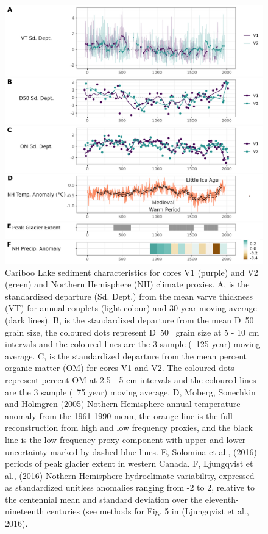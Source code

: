 \documentclass[Royal,times,doublespace,sageh]{sagej}
\begin{document}
\begin{figure}

{\centering \includegraphics[width=1\linewidth]{figs/all_core_stats_2k_anomalies} 

}

\caption{Cariboo Lake sediment characteristics for cores V1 (purple) and V2 (green) and Northern Hemisphere (NH) climate proxies. A, is the standardized departure (Sd. Dept.) from the mean varve thickness (VT) for annual couplets (light colour) and 30-year moving average (dark lines). B, is the standardized departure from the mean D~50~ grain size, the coloured dots represent D~50~ grain size at 5 - 10 cm intervals and the coloured lines are the 3 sample (~125 year) moving average. C, is the standardized departure from the mean percent organic matter (OM) for cores V1 and V2. The coloured dots represent percent OM at 2.5 - 5 cm intervals and the coloured lines are the 3 sample (~75 year) moving average. D, Moberg, Sonechkin and Holmgren (2005) Nothern Hemisphere annual temperature anomaly from the 1961-1990 mean, the orange line is the full reconstruction from high and low frequency proxies, and the black line is the low frequency proxy component with upper and lower uncertainty marked by dashed blue lines. E, Solomina et al., (2016) periods of peak glacier extent in western Canada. F, Ljungqvist et al., (2016) Nothern Hemisphere hydroclimate variability, expressed as standardized unitless anomalies ranging from -2 to 2, relative to the centennial mean and standard deviation over the eleventh-nineteenth centuries (see methods for Fig. 5 in (Ljungqvist et al., 2016).\label{fig:proxy-comparison}}\label{fig:proxy-comparison}
\end{figure}
\end{document}
